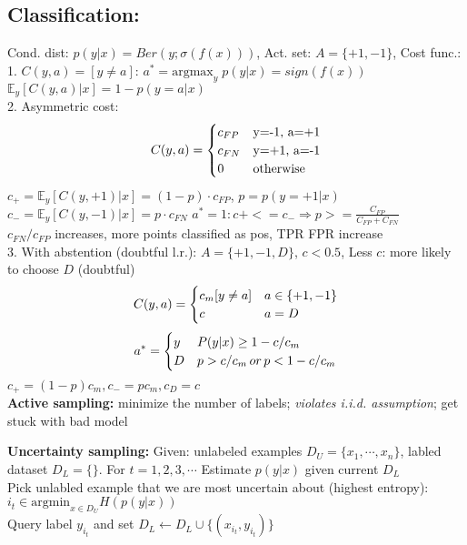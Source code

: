 \subsection{ Classification: }
    Cond. dist: $p(y|x) = Ber(y; \sigma (f(x)) )$, Act. set: $A = \{ +1, -1 \}$, Cost func.: \\
    1. $C(y, a) = [y \neq a]$:  $a^*  = \mathrm{argmax}_y\; p(y|x) = sign(f(x))$\\ \qquad $\mathbb{E}_{y}[C(y, a)|x] = 1 - p(y=a|x)$\\
    2. Asymmetric cost: 
    \vspace{-0.5cm}
        \begin{equation}
        C(y, a)=
        \begin{cases}
        c_{FP}& \text{y=-1, a=+1}\\
        c_{FN}& \text{y=+1, a=-1}\\
        0& \text{otherwise}
        \end{cases}
        \vspace{-0.2cm}
        \end{equation}
        $c_+ = \mathbb{E}_y[C(y, +1)|x]  = (1-p) \cdot c_{FP}$, $p = p(y=+1|x)$
        $c_- = \mathbb{E}_y[C(y, -1)|x]  = p \cdot c_{FN}$
        $a^* = 1: c+ <= c_{-} \Rightarrow p >= \frac{C_{FP}}{C_{FP} + C_{FN}}$ \\
        $c_{FN} / c_{FP}$ increases, more points classified as pos, TPR FPR increase\\
    3. With abstention (doubtful l.r.): $A=\{ +1, -1 , D\}$, $c < 0.5$, Less $c$: more likely to choose $D$ (doubtful)
     \vspace{-0.3cm}
        \begin{equation}
        C(y, a)=
        \begin{cases}
         c_m [y \neq a]& a \in \{+1, -1\}\\
         c& a=D
        \end{cases}
        \vspace{-0.2cm}
        \end{equation}
        \begin{equation}
        \vspace{-0.3cm}
        a^*=
        \begin{cases}
         y& P(y|x) \geq 1-c / c_m\\
         D& p > c / c_m \, or \, p < 1 - c / c_m
        \end{cases}
        \end{equation}
    $c_+ = (1-p)c_m, c_- = pc_m, c_D = c$ \\
    \textbf{Active sampling:} minimize the number of labels; \textit{violates i.i.d. assumption}; get stuck with bad model
    
    \textbf{Uncertainty sampling:} Given: unlabeled examples $D_U = \{x_1, \cdots, x_n \}$, labled dataset $D_L = \{ \}$. For $t = 1, 2, 3, \cdots$ 
    Estimate $p(y|x)$ given current $D_L$\\
    Pick unlabled example that we are most uncertain about (highest entropy): $i_t \in \mathrm{argmin}_{x \in D_U} H(p(y|x))$\\
    Query label $y_{i_t}$ and set $D_L \leftarrow D_L \cup \{( x_{i_t}, y_{i_t} )\}$
    